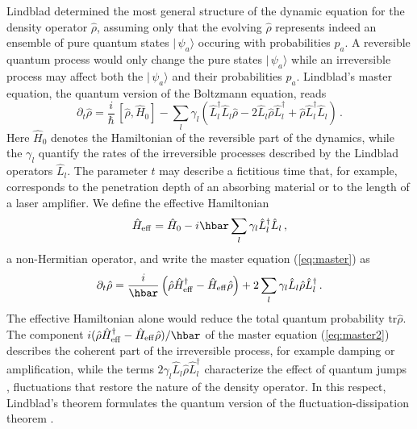 \documentclass[12pt,amsmath,amssymb]{article}
\numberwithin{equation}{section}
\begin{document}
Lindblad \cite{Lindblad} determined the most general structure of
the dynamic equation for the density operator $\hat{\rho}$,
assuming only that the evolving $\hat{\rho}$ represents indeed an
ensemble of pure quantum states $|\,\psi_a\rangle$ occuring with
probabilities $p_a$. A reversible quantum process would only
change the pure states $|\,\psi_a\rangle$ while an irreversible
process may affect both the $|\,\psi_a\rangle$ and their
probabilities $p_a$. Lindblad's master equation, the quantum
version of the Boltzmann equation,
reads \cite{BP,Carmichael,Gardiner,GardinerZoller,Lindblad}
\begin{equation}
\label{eq:master}
\partial_t \hat{\rho} = \frac{i}{\hbar}\,[\hat{\rho},\hat{H}_0] -
\sum_l \gamma_l \left( \hat{L}_l^\dagger\hat{L}_l\hat{\rho} -
2\hat{L}_l\hat{\rho}\hat{L}_l^\dagger +
\hat{\rho}\hat{L}_l^\dagger\hat{L}_l \right) \,.
\end{equation}
Here $\hat{H}_0$ denotes the Hamiltonian of the reversible part
of the dynamics, while the $\gamma_l$ quantify the rates of the
irreversible processes described by the Lindblad operators
$\hat{L}_l$. The parameter $t$
may describe a fictitious time that, for example,
corresponds to the
penetration depth of an absorbing material or to the length
of a laser amplifier.
We define the effective Hamiltonian
\begin{equation}
\hat{H}_{\rm eff} = \hat{H}_0 -i\hbar \sum_l \gamma_l
\hat{L}_l^\dagger\hat{L}_l \,,
\end{equation}
a non-Hermitian operator, and write the master equation
(\ref{eq:master}) as
\begin{equation}
\label{eq:master2}
\partial_t \hat{\rho} =
\frac{i}{\hbar}\left(\hat{\rho}\hat{H}_{\rm eff}^\dagger -
\hat{H}_{\rm eff}\hat{\rho}\right) +
2\sum_l\gamma_l\hat{L}_l\hat{\rho}\hat{L}_l^\dagger  \,.
\end{equation}
The effective Hamiltonian alone would reduce the total quantum
probability $\mathrm{tr}\hat{\rho}$. The component
$i(\hat{\rho}\hat{H}_{\rm eff}^\dagger - \hat{H}_{\rm
eff}\hat{\rho})/\hbar$ of the master equation (\ref{eq:master2})
describes the coherent part of the irreversible process, for
example damping or amplification, while the terms
$2\gamma_l\hat{L}_l\hat{\rho}\hat{L}_l^\dagger$ characterize the
effect of quantum jumps \cite{BP,Carmichael}, fluctuations that
restore the nature of the density operator. In this respect,
Lindblad's theorem \cite{Lindblad} formulates the quantum version
of the fluctuation-dissipation theorem \cite{LL5}.
\end{document}
